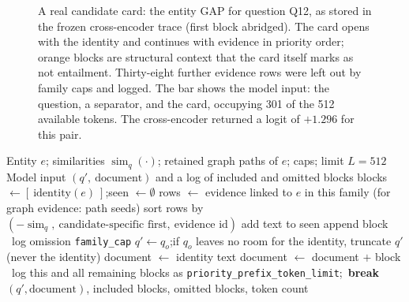 \documentclass[11pt,a4paper]{article}
\newcommand{\cref}[1]{\autoref{#1}}
\theoremstyle{remark}
\newcommand{\code}[1]{\texttt{\small #1}}
\DeclareMathOperator{\simop}{sim}
\begin{document}
\begin{figure}[!htbp]
{}
\caption[A query-dependent candidate card and its token packing]{A real candidate card: the entity GAP for question Q12, as stored in the frozen
cross-encoder trace (first block abridged). The card opens with the identity and continues
with evidence in priority order; orange blocks are structural context that the card itself
marks as not entailment. Thirty-eight further evidence rows were left out by family caps
and logged. The bar shows the model input: the question, a separator, and the card,
occupying 301 of the 512 available tokens. The cross-encoder returned a logit of $+1.296$
for this pair.}
\label{fig:card}
\end{figure}

\begin{algorithm}[!htbp]
\caption{Card construction and token packing for one candidate}
\label{alg:card}
\begin{algorithmic}[1]
\Require Entity $e$; similarities $\simop_q(\cdot)$; retained graph paths of $e$; caps; limit $L=512$
\Ensure Model input $(q',\ \text{document})$ and a log of included and omitted blocks
\State blocks $\gets[\ \text{identity}(e)\ ]$;\quad seen $\gets\emptyset$
\For{each family in priority order (\cref{tab:caps})}
  \State rows $\gets$ evidence linked to $e$ in this family (for graph evidence: path seeds)
  \State sort rows by $(-\simop_q,\ \text{candidate-specific first},\ \text{evidence id})$
    \State add text to seen
     append block
    \Else\ log omission \code{family\_cap}
    \EndIf
  \EndFor
\EndFor
\State $q'\gets q_o$;\quad if $q_o$ leaves no room for the identity, truncate $q'$ (never the identity)
\State document $\gets$ identity text
   document $\gets$ document $+$ block
  \Else\ log this and all remaining blocks as \code{priority\_prefix\_token\_limit};\ \textbf{break}
  \EndIf
\EndFor
\State \Return $(q',\text{document})$, included blocks, omitted blocks, token count
\end{algorithmic}
\end{algorithm}
\end{document}
